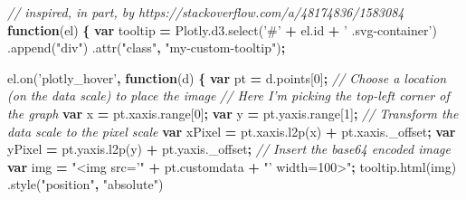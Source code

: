 \documentclass[
  12pt,
]{krantz}
\newenvironment{Shaded}{\begin{snugshade}}{\end{snugshade}}
\newcommand{\AttributeTok}[1]{\textcolor[rgb]{0.77,0.63,0.00}{#1}}
\newcommand{\CommentTok}[1]{\textcolor[rgb]{0.56,0.35,0.01}{\textit{#1}}}
\newcommand{\DecValTok}[1]{\textcolor[rgb]{0.00,0.00,0.81}{#1}}
\newcommand{\KeywordTok}[1]{\textcolor[rgb]{0.13,0.29,0.53}{\textbf{#1}}}
\newcommand{\NormalTok}[1]{#1}
\newcommand{\OperatorTok}[1]{\textcolor[rgb]{0.81,0.36,0.00}{\textbf{#1}}}
\newcommand{\StringTok}[1]{\textcolor[rgb]{0.31,0.60,0.02}{#1}}
\newcommand{\VariableTok}[1]{\textcolor[rgb]{0.00,0.00,0.00}{#1}}
\begin{document}
\begin{Shaded}
\begin{Highlighting}[]
\CommentTok{// inspired, in part, by https://stackoverflow.com/a/48174836/1583084}
\KeywordTok{function}\NormalTok{(el) }\OperatorTok{\{}
  \KeywordTok{var}\NormalTok{ tooltip }\OperatorTok{=} \VariableTok{Plotly}\NormalTok{.}\VariableTok{d3}\NormalTok{.}\AttributeTok{select}\NormalTok{(}\StringTok{'#'} \OperatorTok{+} \VariableTok{el}\NormalTok{.}\AttributeTok{id} \OperatorTok{+} \StringTok{' .svg-container'}\NormalTok{)}
\NormalTok{    .}\AttributeTok{append}\NormalTok{(}\StringTok{"div"}\NormalTok{)}
\NormalTok{    .}\AttributeTok{attr}\NormalTok{(}\StringTok{"class"}\OperatorTok{,} \StringTok{"my-custom-tooltip"}\NormalTok{)}\OperatorTok{;}

  \VariableTok{el}\NormalTok{.}\AttributeTok{on}\NormalTok{(}\StringTok{'plotly_hover'}\OperatorTok{,} \KeywordTok{function}\NormalTok{(d) }\OperatorTok{\{}
    \KeywordTok{var}\NormalTok{ pt }\OperatorTok{=} \VariableTok{d}\NormalTok{.}\AttributeTok{points}\NormalTok{[}\DecValTok{0}\NormalTok{]}\OperatorTok{;}
    \CommentTok{// Choose a location (on the data scale) to place the image}
    \CommentTok{// Here I'm picking the top-left corner of the graph}
    \KeywordTok{var}\NormalTok{ x }\OperatorTok{=} \VariableTok{pt}\NormalTok{.}\VariableTok{xaxis}\NormalTok{.}\AttributeTok{range}\NormalTok{[}\DecValTok{0}\NormalTok{]}\OperatorTok{;}
    \KeywordTok{var}\NormalTok{ y }\OperatorTok{=} \VariableTok{pt}\NormalTok{.}\VariableTok{yaxis}\NormalTok{.}\AttributeTok{range}\NormalTok{[}\DecValTok{1}\NormalTok{]}\OperatorTok{;}
    \CommentTok{// Transform the data scale to the pixel scale}
    \KeywordTok{var}\NormalTok{ xPixel }\OperatorTok{=} \VariableTok{pt}\NormalTok{.}\VariableTok{xaxis}\NormalTok{.}\AttributeTok{l2p}\NormalTok{(x) }\OperatorTok{+} \VariableTok{pt}\NormalTok{.}\VariableTok{xaxis}\NormalTok{.}\AttributeTok{_offset}\OperatorTok{;}
    \KeywordTok{var}\NormalTok{ yPixel }\OperatorTok{=} \VariableTok{pt}\NormalTok{.}\VariableTok{yaxis}\NormalTok{.}\AttributeTok{l2p}\NormalTok{(y) }\OperatorTok{+} \VariableTok{pt}\NormalTok{.}\VariableTok{yaxis}\NormalTok{.}\AttributeTok{_offset}\OperatorTok{;}
    \CommentTok{// Insert the base64 encoded image}
    \KeywordTok{var}\NormalTok{ img }\OperatorTok{=} \StringTok{"<img src='"} \OperatorTok{+}  \VariableTok{pt}\NormalTok{.}\AttributeTok{customdata} \OperatorTok{+} \StringTok{"' width=100>"}\OperatorTok{;}
    \VariableTok{tooltip}\NormalTok{.}\AttributeTok{html}\NormalTok{(img)}
\NormalTok{      .}\AttributeTok{style}\NormalTok{(}\StringTok{"position"}\OperatorTok{,} \StringTok{"absolute"}\NormalTok{)}

\end{Highlighting}
\end{Shaded}
\end{document}
